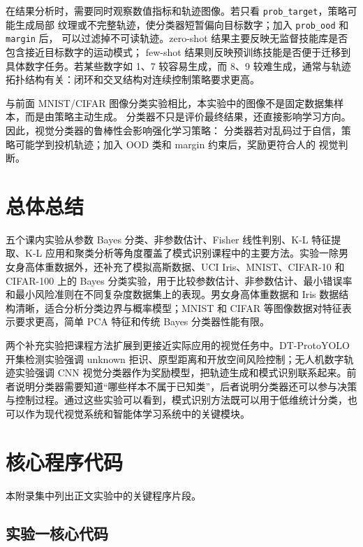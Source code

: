 \documentclass[UTF8,a4paper,12pt]{ctexart}
\begin{document}
在结果分析时，需要同时观察数值指标和轨迹图像。若只看 \texttt{prob\_target}，策略可能生成局部
纹理或不完整轨迹，使分类器短暂偏向目标数字；加入 \texttt{prob\_ood} 和 \texttt{margin} 后，
可以过滤掉不可读轨迹。zero-shot 结果主要反映无监督技能库是否包含接近目标数字的运动模式；
few-shot 结果则反映预训练技能是否便于迁移到具体数字任务。若某些数字如 1、7 较容易生成，而
8、9 较难生成，通常与轨迹拓扑结构有关：闭环和交叉结构对连续控制策略要求更高。

与前面 MNIST/CIFAR 图像分类实验相比，本实验中的图像不是固定数据集样本，而是由策略主动生成。
分类器不只是评价最终结果，还直接影响学习方向。因此，视觉分类器的鲁棒性会影响强化学习策略：
分类器若对乱码过于自信，策略可能学到投机轨迹；加入 OOD 类和 margin 约束后，奖励更符合人的
视觉判断。

\clearpage
\section{总体总结}

五个课内实验从参数 Bayes 分类、非参数估计、Fisher 线性判别、K-L 特征提取、K-L 应用和聚类分析等角度覆盖了模式识别课程中的主要方法。实验一除男女身高体重数据外，还补充了模拟高斯数据、UCI Iris、MNIST、CIFAR-10 和 CIFAR-100 上的 Bayes 分类实验，用于比较参数估计、非参数估计、最小错误率和最小风险准则在不同复杂度数据集上的表现。男女身高体重数据和 Iris 数据结构清晰，适合分析分类边界与概率模型；MNIST 和 CIFAR 等图像数据对特征表示要求更高，简单 PCA 特征和传统 Bayes 分类器性能有限。

两个补充实验把课程方法扩展到更接近实际应用的视觉任务中。DT-ProtoYOLO 开集检测实验强调 unknown 拒识、原型距离和开放空间风险控制；无人机数字轨迹实验强调 CNN 视觉分类器作为奖励模型，把轨迹生成和模式识别联系起来。前者说明分类器需要知道“哪些样本不属于已知类”，后者说明分类器还可以参与决策与控制过程。通过这些实验可以看到，模式识别方法既可以用于低维统计分类，也可以作为现代视觉系统和智能体学习系统中的关键模块。
\clearpage

\appendix

\section{核心程序代码}

本附录集中列出正文实验中的关键程序片段。

\subsection{实验一核心代码}
\end{document}
